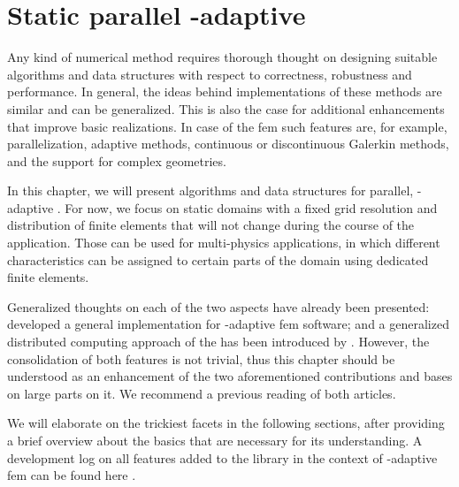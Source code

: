 \chapter{Static parallel \hp-adaptive }
\label{ch:parallel}
\glsresetall

Any kind of numerical method requires thorough thought on designing suitable algorithms and data structures with respect to correctness, robustness and performance. In general, the ideas behind implementations of these methods are similar and can be generalized.
This is also the case for additional enhancements that improve basic realizations. In case of the \gls{fem} such features are, for example, parallelization, adaptive methods, continuous or discontinuous Galerkin methods, and the support for complex geometries.

In this chapter, we will present algorithms and data structures for parallel, \hp-adaptive . For now, we focus on static domains with a fixed grid resolution and distribution of finite elements that will not change during the course of the application. Those can be used for multi-physics applications, in which different characteristics can be assigned to certain parts of the domain using dedicated finite elements.

Generalized thoughts on each of the two aspects have already been presented: \textcite{bangerth2009} developed a general implementation for \hp-adaptive \gls{fem} software; and a generalized distributed computing approach of the  has been introduced by \textcite{bangerth2012}. However, the consolidation of both features is not trivial, thus this chapter should be understood as an enhancement of the two aforementioned contributions and bases on large parts on it. We recommend a previous reading of both articles.

We will elaborate on the trickiest facets in the following sections, after providing a brief overview about the basics that are necessary for its understanding. A development log on all features added to the \dealii{} library in the context of \hp-adaptive \gls{fem} can be found here \textcite{dealiiissue3511}.



\setcounter{section}{-1}


